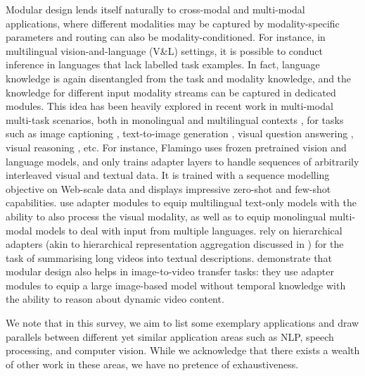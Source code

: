 \documentclass[10pt]{article} %
\begin{document}
Modular design lends itself naturally to cross-modal and multi-modal applications, where different modalities may be captured by modality-specific parameters and routing can also be modality-conditioned. For instance, in multilingual vision-and-language (V\&L) settings, it is possible to conduct inference in languages that lack labelled task examples. In fact, language knowledge is again disentangled from the task and modality knowledge, and the knowledge for different input modality streams can be captured in dedicated modules. This idea has been heavily explored in recent work in multi-modal multi-task scenarios, both in monolingual \citep{Sung:2022modal} and multilingual contexts \citep{bugliarello2022iglue,pfeiffer-etal-2022-xgqa}, for tasks such as image captioning \citep{Zhou:2022modal,Gao:2021modal}, text-to-image generation \citep{Maharana:2022modal}, visual question answering \citep{Liu:2022delving,Sung:2022modal}, visual reasoning \citep{liu-etal-2021-visually}, etc. For instance, Flamingo \citep{alayrac2022flamingo} uses frozen pretrained vision and language models, and only trains adapter layers to handle sequences of arbitrarily interleaved visual and textual data. It is trained with a sequence modelling objective on Web-scale data \citep{li2021align} and displays impressive zero-shot and few-shot capabilities. \cite{pfeiffer-etal-2022-xgqa} use adapter modules to equip multilingual text-only models with the ability to also process the visual modality, as well as to equip monolingual multi-modal models to deal with input from multiple languages. \citet{Papalampidi:2022modal} rely on hierarchical adapters (akin to hierarchical representation aggregation discussed in ) for the task of summarising long videos into textual descriptions. \citet{Pan:2022modal} demonstrate that modular design also helps in image-to-video transfer tasks: they use adapter modules to equip a large image-based model without temporal knowledge with the ability to reason about dynamic video content. 


We note that in this survey, we aim to list some exemplary applications and draw parallels between different yet similar application areas such as NLP, speech processing, and computer vision. While we acknowledge that there exists a wealth of other work in these areas, we have no pretence of exhaustiveness.

 
 
\end{document}
